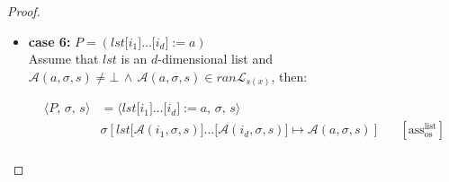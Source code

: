 \documentclass{article}
\begin{document}
\begin{proof}
\begin{itemize}
    Assume that $x$ is of a basic type and $\mathcal{A}(a, \sigma, s) \neq \bot \,\land\, \mathcal{A}(a, \sigma, s) \in ran\mathcal{L}_{s(x)}$, then:

    \[
      \begin{aligned}
      \langle P,\, \sigma,\, s \rangle
      &=\langle x \;\texttt{:=}\; a,\, \sigma,\, s \rangle \\
      &\sigma[x \mapsto \mathcal{A}(a, \sigma, s)]
      && [ \text{ass}_{\text{os}} ] \\   
      \end{aligned}
  \]
  
  then

  \[
      \begin{aligned}
      \langle \mathcal{C}(P),\, e,\, \sigma,\, s,\, pc \rangle
      &= \langle \mathcal{C}(x \;\texttt{:=}\; a),\, e,\, \sigma,\, s,\, pc \rangle \\
      &= \langle \mathcal{CA}(a) : \texttt{STORE}\;x ,\, e,\, \sigma,\, s,\, pc \rangle
      && \text{(definition of } \mathcal{C}\text{)} \\   
      &\triangleright^\ast \langle \texttt{STORE}\;x ,\, \mathcal{A}(a, \sigma, s) : e,\, \sigma,\, s,\, pc + l_a \rangle
      && \text{(correctness of } \mathcal{CA}\text{)} \\ 
      &= \langle \epsilon ,\,  e,\, \sigma[x \mapsto \mathcal{A}(a, \sigma, s)],\, s,\, pc + l_a + 1 \rangle
      && \text{(operational semantics)} \\ 
      \end{aligned}
  \]
  \item \textbf{case 6:} $P = (lst\texttt{[$i_1$]}\dots\texttt{[$i_d$]} \;\texttt{:=}\; a)$\\

    Assume that $lst$ is an $d$-dimensional list and $\mathcal{A}(a, \sigma, s) \neq \bot \,\land\, \mathcal{A}(a, \sigma, s) \in ran\mathcal{L}_{s(x)}$, then:

    \[
      \begin{aligned}
      \langle P,\, \sigma,\, s \rangle
      &=\langle lst\texttt{[$i_1$]}\dots\texttt{[$i_d$]} \;\texttt{:=}\; a,\, \sigma,\, s \rangle \\
      &\sigma[lst\texttt{[$\mathcal{A}(i_1, \sigma, s)$]}\dots\texttt{[$\mathcal{A}(i_d, \sigma, s)$]} \mapsto \mathcal{A}(a, \sigma, s)]
      && [ \text{ass}^{\text{list}}_{\text{os}} ] \\   
      \end{aligned}
  \]
  

\end{itemize}
\end{proof}
\end{document}
